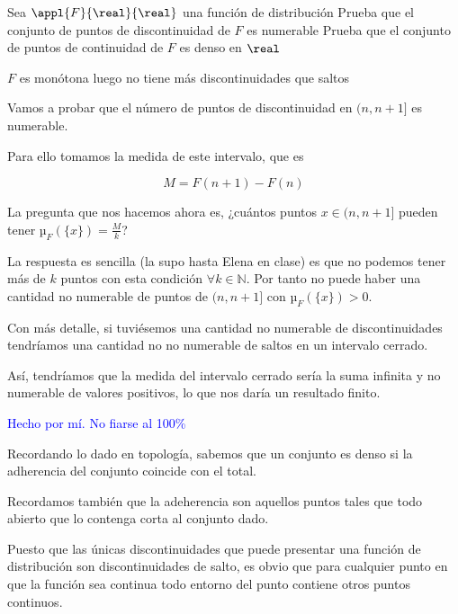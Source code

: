 \begin{problem}
Sea $\appl{F}{\real}{\real}$ una función de distribución
\ppart Prueba que el conjunto de puntos de discontinuidad de $F$ es numerable
\ppart Prueba que el conjunto de puntos de continuidad de $F$ es denso en $\real$

\obs $F$ es monótona luego no tiene más discontinuidades que saltos
\solution

\spart Vamos a probar que el número de puntos de discontinuidad en $(n, n+1]$ es numerable.

Para ello tomamos la medida de este intervalo, que es

\[ M = F(n+1)-F(n)\]

La pregunta que nos hacemos ahora es, ¿cuántos puntos $x \in (n, n+1]$ pueden tener $µ_F(\{x\}) = \frac{M}{k}$?

La respuesta es sencilla (la supo hasta Elena en clase) es que no podemos tener más de $k$ puntos con esta condición $∀k ∈ ℕ$. Por tanto no puede haber una cantidad no numerable de puntos de $(n, n+1]$ con $µ_F(\{x\})>0$.

Con más detalle, si tuviésemos una cantidad no numerable de discontinuidades tendríamos una cantidad no no numerable de saltos en un intervalo cerrado.

Así, tendríamos que la medida del intervalo cerrado sería la suma infinita y no numerable de valores positivos, lo que nos daría un resultado finito.


\spart \textcolor{blue}{Hecho por mí. No fiarse al 100\%}

Recordando lo dado en topología, sabemos que un conjunto es denso si la adherencia del conjunto coincide con el total.

Recordamos también que la adeherencia son aquellos puntos tales que todo abierto que lo contenga corta al conjunto dado.

Puesto que las únicas discontinuidades que puede presentar una función de distribución son discontinuidades de salto, es obvio que para cualquier punto en que la función sea continua todo entorno del punto contiene otros puntos continuos.

\end{problem}

